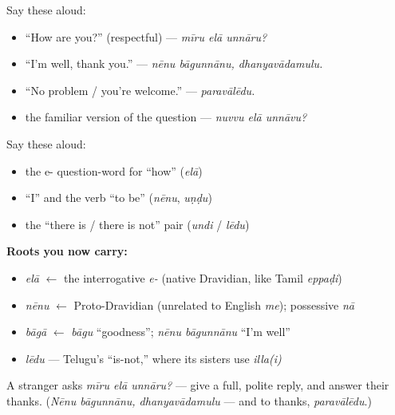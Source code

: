 Say these aloud:

\begin{itemize}
\raggedright
  \item \textquotedblleft{}How are you?\textquotedblright{} (respectful) — \emph{mīru elā unnāru?}
  \item \textquotedblleft{}I'm well, thank you.\textquotedblright{} — \emph{nēnu bāgunnānu, dhanyavādamulu.}
  \item \textquotedblleft{}No problem / you're welcome.\textquotedblright{} — \emph{paravālēdu.}
  \item the familiar version of the question — \emph{nuvvu elā unnāvu?}
\end{itemize}

\begin{grammarlens}[title={What you've built — the atoms}]
Say these aloud:

\begin{itemize}
\raggedright
  \item the e- question-word for \textquotedblleft{}how\textquotedblright{} (\emph{elā})
  \item \textquotedblleft{}I\textquotedblright{} and the verb \textquotedblleft{}to be\textquotedblright{} (\emph{nēnu}, \emph{uṇḍu})
  \item the \textquotedblleft{}there is / there is not\textquotedblright{} pair (\emph{undi} / \emph{lēdu})
\end{itemize}
\end{grammarlens}

\begin{cousinweb}
\textbf{Roots you now carry:}

\begin{itemize}
\raggedright
  \item \emph{elā} $\leftarrow$ the interrogative \emph{e-} (native Dravidian, like Tamil \emph{eppaḍi})
  \item \emph{nēnu} $\leftarrow$ Proto-Dravidian (unrelated to English \emph{me}); possessive \emph{nā}
  \item \emph{bāgā} $\leftarrow$ \emph{bāgu} \textquotedblleft{}goodness\textquotedblright{}; \emph{nēnu bāgunnānu} \textquotedblleft{}I'm well\textquotedblright{}
  \item \emph{lēdu} — Telugu's \textquotedblleft{}is-not,\textquotedblright{} where its sisters use \emph{illa(i)}
\end{itemize}
\end{cousinweb}

\begin{tcolorbox}[breakable,colback=teal!4,colframe=teal!35!black,title={Before you move on}]
A stranger asks \emph{mīru elā unnāru?} — give a full, polite reply, and answer their thanks. (\emph{Nēnu bāgunnānu, dhanyavādamulu} — and to thanks, \emph{paravālēdu}.)
\end{tcolorbox}
